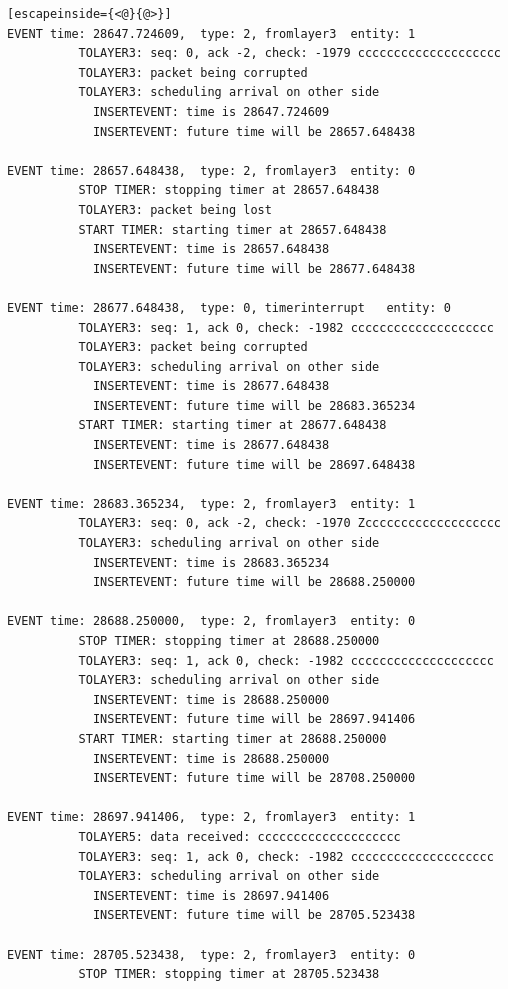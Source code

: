 \documentclass[paper=a4, fontsize=11pt]{scrartcl}
\numberwithin{equation}{section}		%
\numberwithin{figure}{section}			%
\numberwithin{table}{section}				%
\begin{document}
\begin{lstlisting}[escapeinside={<@}{@>}]
EVENT time: 28647.724609,  type: 2, fromlayer3  entity: 1
          TOLAYER3: seq: 0, ack -2, check: -1979 cccccccccccccccccccc
          TOLAYER3: packet being corrupted
          TOLAYER3: scheduling arrival on other side
            INSERTEVENT: time is 28647.724609
            INSERTEVENT: future time will be 28657.648438

EVENT time: 28657.648438,  type: 2, fromlayer3  entity: 0
          STOP TIMER: stopping timer at 28657.648438
          TOLAYER3: packet being lost
          START TIMER: starting timer at 28657.648438
            INSERTEVENT: time is 28657.648438
            INSERTEVENT: future time will be 28677.648438

EVENT time: 28677.648438,  type: 0, timerinterrupt   entity: 0
          TOLAYER3: seq: 1, ack 0, check: -1982 cccccccccccccccccccc
          TOLAYER3: packet being corrupted
          TOLAYER3: scheduling arrival on other side
            INSERTEVENT: time is 28677.648438
            INSERTEVENT: future time will be 28683.365234
          START TIMER: starting timer at 28677.648438
            INSERTEVENT: time is 28677.648438
            INSERTEVENT: future time will be 28697.648438

EVENT time: 28683.365234,  type: 2, fromlayer3  entity: 1
          TOLAYER3: seq: 0, ack -2, check: -1970 Zccccccccccccccccccc
          TOLAYER3: scheduling arrival on other side
            INSERTEVENT: time is 28683.365234
            INSERTEVENT: future time will be 28688.250000

EVENT time: 28688.250000,  type: 2, fromlayer3  entity: 0
          STOP TIMER: stopping timer at 28688.250000
          TOLAYER3: seq: 1, ack 0, check: -1982 cccccccccccccccccccc
          TOLAYER3: scheduling arrival on other side
            INSERTEVENT: time is 28688.250000
            INSERTEVENT: future time will be 28697.941406
          START TIMER: starting timer at 28688.250000
            INSERTEVENT: time is 28688.250000
            INSERTEVENT: future time will be 28708.250000

EVENT time: 28697.941406,  type: 2, fromlayer3  entity: 1
          TOLAYER5: data received: cccccccccccccccccccc
          TOLAYER3: seq: 1, ack 0, check: -1982 cccccccccccccccccccc
          TOLAYER3: scheduling arrival on other side
            INSERTEVENT: time is 28697.941406
            INSERTEVENT: future time will be 28705.523438

EVENT time: 28705.523438,  type: 2, fromlayer3  entity: 0
          STOP TIMER: stopping timer at 28705.523438


\end{lstlisting}
\end{document}
